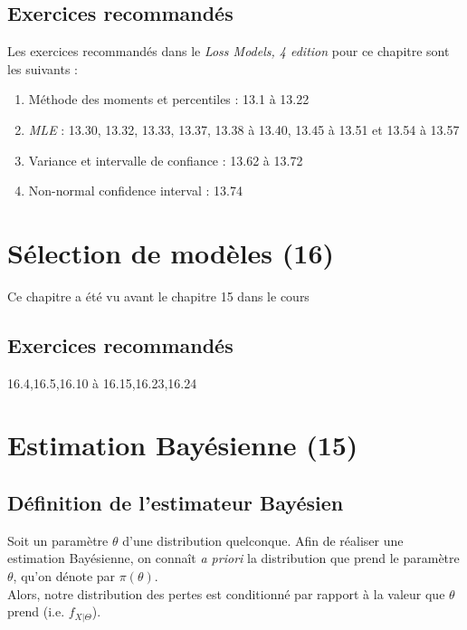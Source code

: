 \documentclass[12pt, french]{report}
\begin{document}
\section{Exercices recommandés}
Les exercices recommandés dans le \emph{Loss Models, 4 edition} pour ce chapitre sont les suivants : 
\begin{enumerate}[label=\faAngleRight]
\item Méthode des moments et percentiles : 13.1 à 13.22
\item \emph{MLE} : 13.30, 13.32, 13.33, 13.37, 13.38 à 13.40, 13.45 à 13.51 et 13.54 à 13.57
\item Variance et intervalle de confiance : 13.62 à 13.72
\item Non-normal confidence interval : 13.74 
\end{enumerate}





\chapter{Sélection de modèles (16)}
Ce chapitre a été vu avant le chapitre 15 dans le cours


\section{Exercices recommandés}
16.4,16.5,16.10 à 16.15,16.23,16.24







\chapter{Estimation Bayésienne (15)}
\section{Définition de l'estimateur Bayésien}
\begin{definition}
Soit un paramètre $\theta$ d'une distribution quelconque. Afin de réaliser une estimation Bayésienne, on connaît \emph{a priori} la distribution que prend le paramètre $\theta$, qu'on dénote par $\pi(\theta)$. \\

Alors, notre distribution des pertes est conditionné par rapport à la valeur que $\theta$ prend (i.e. $f_{X|\Theta}$).
\end{definition}
\end{document}
